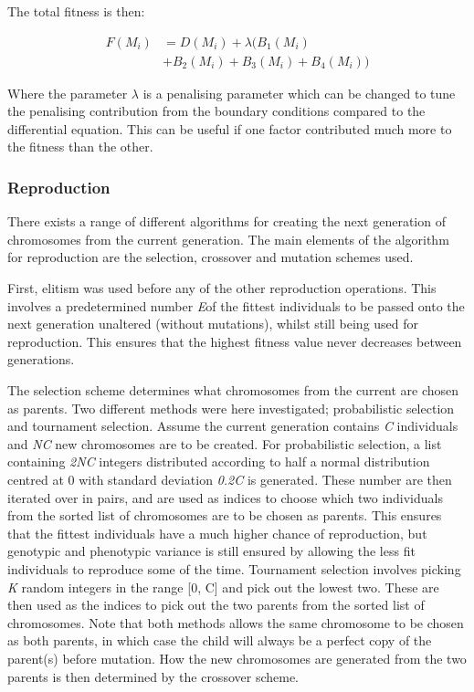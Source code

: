 \documentclass[multicolumn, 12pt]{extarticle}
\begin{document}
The total fitness is then:

\begin{align*}
	F(M_{i}) & = D(M_{i}) + \lambda  ( B_1(M_{i})            \\
	         & +  B_2(M_{i})  +  B_3(M_{i})  + B_4(M_{i})  )
\end{align*}

Where the parameter $\lambda$ is a penalising parameter which can be changed to tune the penalising contribution from the boundary conditions compared to the differential equation. This can be useful if one factor contributed much more to the fitness than the other.

\subsubsection{Reproduction}
There exists a range of different algorithms for creating the next generation of chromosomes from the current generation. The main elements  of the algorithm for reproduction are the selection, crossover and mutation schemes used.

First, elitism was used before any of the other reproduction operations. This involves a predetermined number  \textit{E}of the fittest individuals to be passed onto the next generation unaltered (without mutations), whilst still being used for reproduction. This ensures that the highest fitness value never decreases between generations.

The selection scheme determines what chromosomes from the current are chosen as parents. Two different methods were here investigated; probabilistic selection and tournament selection. Assume the current generation contains \textit{C} individuals and \textit{NC} new chromosomes are to be created. For probabilistic selection, a list containing \textit{2NC} integers distributed according to half a normal distribution centred at 0 with standard deviation \textit{0.2C} is generated. These number are then iterated over in pairs, and are used as indices to choose which two individuals from the sorted list of chromosomes are to be chosen as parents. This ensures that the fittest individuals have a much higher chance of reproduction, but genotypic and phenotypic variance is still ensured by allowing the less fit individuals to reproduce some of the time. Tournament selection involves picking \textit{K} random integers in the range [0, C] and pick out the lowest two. These are then used as the indices to pick out the two parents from the sorted list of chromosomes. Note that both methods allows the same chromosome to be chosen as both parents, in which case the child will always be a perfect copy of the parent(s) before mutation. How the new chromosomes are generated from the two parents is then determined by the crossover scheme.
\end{document}
